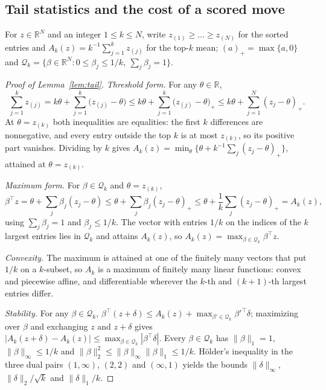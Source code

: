 \subsection{Tail statistics and the cost of a scored move}

For $z\in\mathbb R^N$ and an integer $1\le k\le N$, write $z_{(1)}\ge\dots\ge z_{(N)}$
for the sorted entries and $A_k(z)=k^{-1}\sum_{j=1}^kz_{(j)}$ for the top-$k$ mean;
$(a)_+=\max\{a,0\}$ and
$\mathcal Q_k=\{\beta\in\mathbb R^N:0\le\beta_j\le1/k,\ \sum_j\beta_j=1\}$.

\begin{proof}[Proof of Lemma~\ref{lem:tail}]
\emph{Threshold form.} For any $\theta\in\mathbb R$,
\begin{equation*}
 \sum_{j=1}^kz_{(j)}=k\theta+\sum_{j=1}^k\bigl(z_{(j)}-\theta\bigr)
 \le k\theta+\sum_{j=1}^k\bigl(z_{(j)}-\theta\bigr)_+
 \le k\theta+\sum_{j=1}^N(z_j-\theta)_+ .
\end{equation*}
At $\theta=z_{(k)}$ both inequalities are equalities: the first $k$ differences are
nonnegative, and every entry outside the top $k$ is at most $z_{(k)}$, so its
positive part vanishes. Dividing by $k$ gives
$A_k(z)=\min_\theta\{\theta+k^{-1}\sum_j(z_j-\theta)_+\}$, attained at
$\theta=z_{(k)}$.

\emph{Maximum form.} For $\beta\in\mathcal Q_k$ and $\theta=z_{(k)}$,
\begin{equation*}
 \beta^{\top}z=\theta+\sum_j\beta_j(z_j-\theta)\le\theta+\sum_j\beta_j(z_j-\theta)_+
 \le\theta+\frac1k\sum_j(z_j-\theta)_+=A_k(z),
\end{equation*}
using $\sum_j\beta_j=1$ and $\beta_j\le1/k$. The vector with entries $1/k$ on the
indices of the $k$ largest entries lies in $\mathcal Q_k$ and attains $A_k(z)$, so
$A_k(z)=\max_{\beta\in\mathcal Q_k}\beta^{\top}z$.

\emph{Convexity.} The maximum is attained at one of the finitely many vectors that put
$1/k$ on a $k$-subset, so $A_k$ is a maximum of finitely many linear functions:
convex and piecewise affine, and differentiable wherever the $k$-th and $(k+1)$-th
largest entries differ.

\emph{Stability.} For any $\beta\in\mathcal Q_k$,
$\beta^{\top}(z+\delta)\le A_k(z)+\max_{\beta'\in\mathcal Q_k}\beta'^{\top}\delta$;
maximizing over $\beta$ and exchanging $z$ and $z+\delta$ gives
$|A_k(z+\delta)-A_k(z)|\le\max_{\beta\in\mathcal Q_k}|\beta^{\top}\delta|$. Every
$\beta\in\mathcal Q_k$ has $\lVert\beta\rVert_1=1$, $\lVert\beta\rVert_\infty\le1/k$
and $\lVert\beta\rVert_2^2\le\lVert\beta\rVert_\infty\lVert\beta\rVert_1\le1/k$.
H\"older's
inequality in the three dual pairs $(1,\infty)$, $(2,2)$ and $(\infty,1)$ yields the
bounds $\lVert\delta\rVert_\infty$, $\lVert\delta\rVert_2/\sqrt k$ and
$\lVert\delta\rVert_1/k$.
\end{proof}
